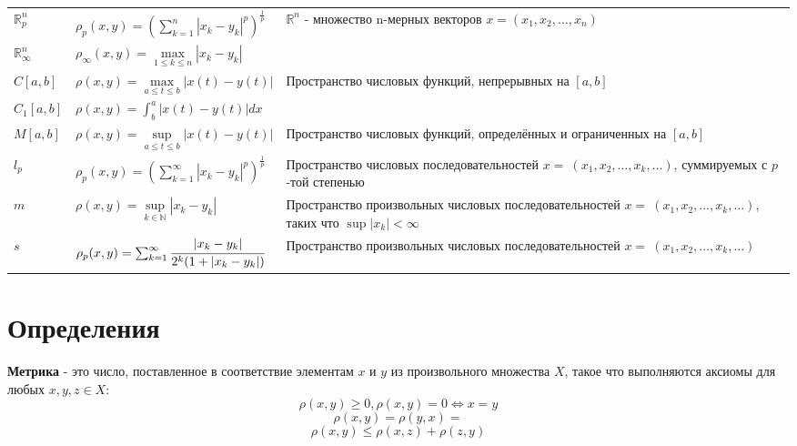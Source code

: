{\begin{tabularx}{\textwidth}{||l|l|X||}
      $\mathbb{R}^n_p$      & $\rho_p (x, y)=(\sum_{k = 1}^{n}|x_k-y_k|^p)^\frac{1}{p}$            & \multirow{2}{6cm}{$\mathbb{R}^n$ - множество n-мерных векторов $x=(x_1, x_2, \dots, x_n)$  }                         \\
      \cline{1-2}
      $\mathbb{R}^n_\infty$ & $\rho_\infty (x, y)=\underset{1\leq k\leq n}{\max}|x_k-y_k|$              &                                                                                                                    \\
      \hline
      $C[a, b]$              & $\rho (x, y)=\underset{a \leq t \leq b}{\max}|x(t)-y(t)|$                 & \multirow{2}{6cm}{Пространство числовых функций, непрерывных на $[a, b]$}                                           \\
      \cline{1-2}
      $C_1[a, b]$            & $\rho (x, y)=\int_{b}^{a}|x(t)-y(t)|dx $                                &                                                                                                                    \\[5pt]
      \hline
      $M[a, b]$              & $\rho (x, y)=\underset{a \leq t \leq b}{\sup}|x(t)-y(t)|$                 & Пространство числовых функций, определённых и ограниченных на $[a, b]$                                              \\
      \hline
      $l_p$                 & $\rho_p (x, y)=(\sum_{k = 1}^{\infty}|x_k-y_k|^p)^\frac{1}{p}$            & Пространство числовых последовательностей $x=~(x_1, x_2, \dots, x_k, \dots)$, суммируемых с $p$-той степенью            \\
      \hline
      $m$                   & $\rho (x, y)=\underset{k \in \mathbb{N} }{\sup}|x_k-y_k|$                 & Пространство произвольных числовых последовательностей $x=~(x_1, x_2, \dots, x_k, \dots)$, таких что $\sup|x_k|<\infty$ \\
      \hline
      $s$                   & $\rho_p (x, y)=\sum_{k = 1}^{\infty} \cfrac{|x_k-y_k|}{2^k(1+|x_k-y_k|)}$ & Пространство произвольных числовых последовательностей $x=~(x_1, x_2, \dots, x_k, \dots)$                               \\
      \hline
  \end{tabularx}}


\section{Определения}

\textbf{Метрика} - это число, поставленное в соответствие элементам $x$ и $y$ из произвольного множества $X$, такое что выполняются аксиомы для любых $x, y, z\in X$:
\[\rho(x, y)\geq 0, \rho(x, y)=0\Longleftrightarrow x=y\]
\[\rho(x, y)=\rho(y, x)=\]
\[\rho(x, y)\leqslant \rho(x, z)+\rho(z, y)\]

